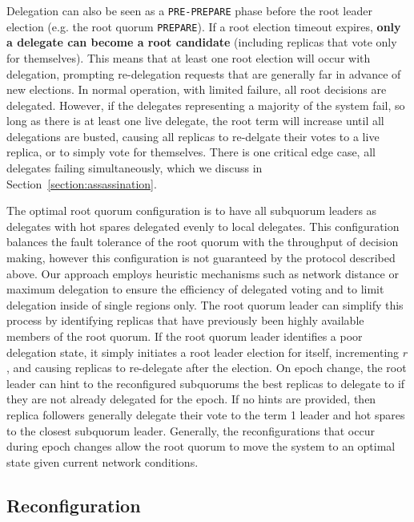 \documentclass[10pt,conference]{IEEEtran}
\newcommand{\sub}{subquorum\xspace}
\newcommand{\subs}{subquorums\xspace}
\newcommand{\roo}{root quorum\xspace}
\begin{document}
Delegation can also be seen as a \texttt{PRE-PREPARE} phase before the root leader
election (e.g. the root quorum \texttt{PREPARE}).
If a root election timeout expires, \textbf{only a delegate can become a root candidate}
(including replicas that vote only for themselves).
This means that at least one root election will occur with delegation, prompting
re-delegation requests that are generally far in advance of new elections. In normal
operation, with limited failure, all root decisions are delegated.
However, if the delegates representing a majority of the system fail, so long as there
is at least one live delegate, the root term will increase until all delegations are
busted, causing all replicas to re-delgate their votes to a live replica, or to simply
vote for themselves.
There is one critical edge case, all delegates failing simultaneously, which we discuss
in Section~\ref{section:assassination}.

The optimal \roo configuration is to have all \sub leaders as delegates with hot spares
delegated evenly to local delegates.
This configuration balances the fault tolerance of the \roo with the throughput of
decision making, however this configuration is not guaranteed by the protocol described
above.
Our approach employs heuristic mechanisms such as network distance or maximum delegation
to ensure the efficiency of delegated voting and to limit delegation inside of single
regions only.
The \roo leader can simplify this process by identifying replicas that have previously
been highly available members of the root quorum.
If the \roo leader identifies a poor delegation state, it simply initiates a root leader
election for itself, incrementing $r$, and causing replicas to re-delegate after the
election.
On epoch change, the root leader can hint to the reconfigured \subs the best replicas
to delegate to if they are not already delegated for the epoch.
If no hints are provided, then replica followers generally delegate their vote to the
term 1 leader and hot spares to the closest subquorum leader.
Generally, the reconfigurations that occur during epoch changes allow the \roo to move
the system to an optimal state given current network conditions.

\subsection{Reconfiguration}
\label{section:reconfiguration}

\end{document}

